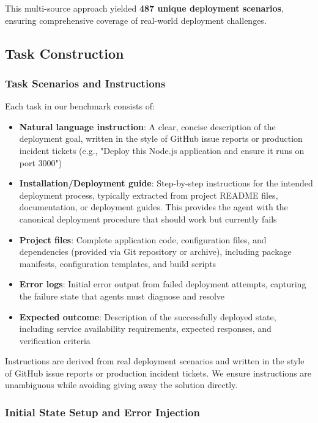 This multi-source approach yielded \textbf{487 unique deployment scenarios}, ensuring comprehensive coverage of real-world deployment challenges.

\subsection{Task Construction}\label{sec:task-construction}

\subsubsection{Task Scenarios and Instructions}

Each task in our benchmark consists of:

\begin{itemize}
\item \textbf{Natural language instruction}: A clear, concise description of the deployment goal, written in the style of GitHub issue reports or production incident tickets (e.g., "Deploy this Node.js application and ensure it runs on port 3000")
\item \textbf{Installation/Deployment guide}: Step-by-step instructions for the intended deployment process, typically extracted from project README files, documentation, or deployment guides. This provides the agent with the canonical deployment procedure that should work but currently fails
\item \textbf{Project files}: Complete application code, configuration files, and dependencies (provided via Git repository or archive), including package manifests, configuration templates, and build scripts
\item \textbf{Error logs}: Initial error output from failed deployment attempts, capturing the failure state that agents must diagnose and resolve
\item \textbf{Expected outcome}: Description of the successfully deployed state, including service availability requirements, expected responses, and verification criteria
\end{itemize}
Instructions are derived from real deployment scenarios and written in the style of GitHub issue reports or production incident tickets. We ensure instructions are unambiguous while avoiding giving away the solution directly.

\subsubsection{Initial State Setup and Error Injection}

